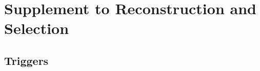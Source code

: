 \chapter{Supplement to Reconstruction and Selection}
\label{app:recon}

\section{Triggers}
\label{app:triggers}


